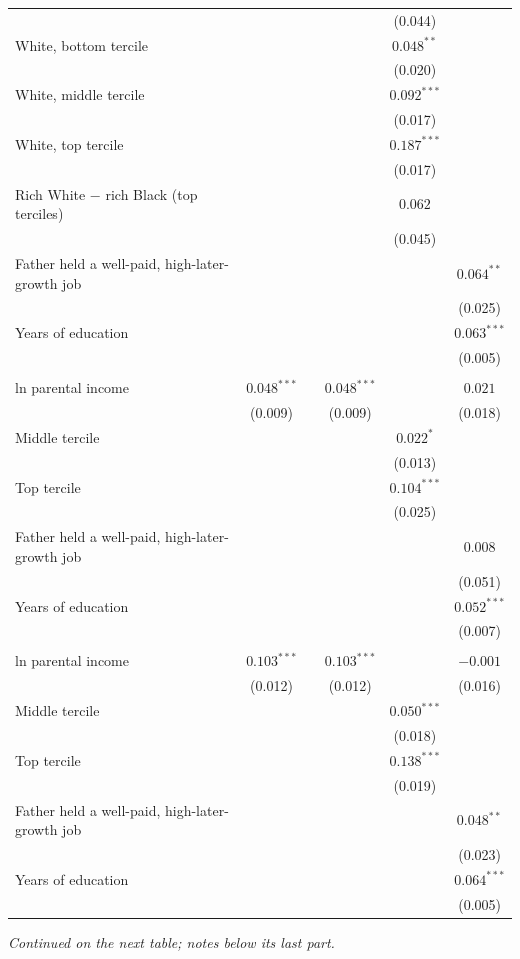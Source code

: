\begin{table}[!htbp]
{{\begin{tabular}{lccccc}
 &  &  &  & (0.044) &  \\
White, bottom tercile &  &  &  & $0.048^{**}$ &  \\
 &  &  &  & (0.020) &  \\
White, middle tercile &  &  &  & $0.092^{***}$ &  \\
 &  &  &  & (0.017) &  \\
White, top tercile &  &  &  & $0.187^{***}$ &  \\
 &  &  &  & (0.017) &  \\
Rich White $-$ rich Black (top terciles) &  &  &  & $0.062$ &  \\
 &  &  &  & (0.045) &  \\
Father held a well-paid, high-later-growth job &  &  &  &  & $0.064^{**}$ \\
 &  &  &  &  & (0.025) \\
Years of education &  &  &  &  & $0.063^{***}$ \\
 &  &  &  &  & (0.005) \\
\addlinespace
\multicolumn{6}{l}{\textit{Black sons}} \\
ln parental income & $0.048^{***}$ &  & $0.048^{***}$ &  & $0.021$ \\
 & (0.009) &  & (0.009) &  & (0.018) \\
Middle tercile &  &  &  & $0.022^{*}$ &  \\
 &  &  &  & (0.013) &  \\
Top tercile &  &  &  & $0.104^{***}$ &  \\
 &  &  &  & (0.025) &  \\
Father held a well-paid, high-later-growth job &  &  &  &  & $0.008$ \\
 &  &  &  &  & (0.051) \\
Years of education &  &  &  &  & $0.052^{***}$ \\
 &  &  &  &  & (0.007) \\
\addlinespace
\multicolumn{6}{l}{\textit{White sons}} \\
ln parental income & $0.103^{***}$ &  & $0.103^{***}$ &  & $-0.001$ \\
 & (0.012) &  & (0.012) &  & (0.016) \\
Middle tercile &  &  &  & $0.050^{***}$ &  \\
 &  &  &  & (0.018) &  \\
Top tercile &  &  &  & $0.138^{***}$ &  \\
 &  &  &  & (0.019) &  \\
Father held a well-paid, high-later-growth job &  &  &  &  & $0.048^{**}$ \\
 &  &  &  &  & (0.023) \\
Years of education &  &  &  &  & $0.064^{***}$ \\
 &  &  &  &  & (0.005) \\
\bottomrule
\end{tabular}}}
\par\smallskip
\begin{minipage}{\textwidth}\footnotesize \textit{Continued on the next table; notes below its last part.}\end{minipage}
\end{table}
